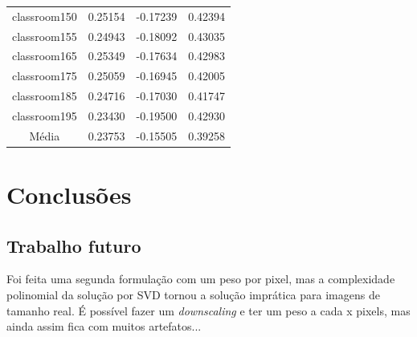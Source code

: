 \documentclass[cic,tc]{iiufrgs}
\begin{document}
\begin{table}[h]
\begin{tabular}{c|c|c|c}
          classroom150 & 0.25154 & -0.17239 & 0.42394 \\
          classroom155 & 0.24943 & -0.18092 & 0.43035 \\
          classroom165 & 0.25349 & -0.17634 & 0.42983 \\
          classroom175 & 0.25059 & -0.16945 & 0.42005 \\
          classroom185 & 0.24716 & -0.17030 & 0.41747 \\
          classroom195 & 0.23430 & -0.19500 & 0.42930 \\
          \hline
          \hline
          Média        & 0.23753 & -0.15505 & 0.39258 \\
          \hline
        \end{tabular}
    \label{tbl:results1}
\end{table}


\chapter{Conclusões}

\section{Trabalho futuro}
Foi feita uma segunda formulação com um peso por pixel, mas a complexidade polinomial da solução por SVD tornou a solução imprática para imagens de tamanho real. É possível fazer um \textit{downscaling} e ter um peso a cada x pixels, mas ainda assim fica com muitos artefatos...



\end{document}
